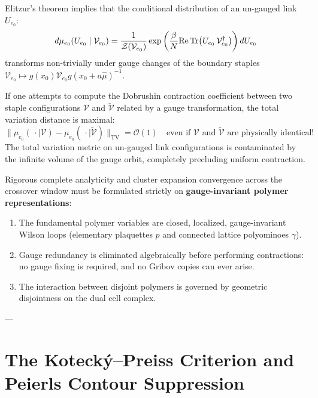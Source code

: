 Elitzur's theorem implies that the conditional distribution of an un-gauged link $U_{e_0}$:
\begin{equation}
\label{eq:ch13_conditional_link_measure}
d\mu_{e_0}(U_{e_0} \mid \mathcal{V}_{e_0}) = \frac{1}{\mathcal{Z}(\mathcal{V}_{e_0})} \exp\left( \frac{\beta}{N} \mathrm{Re} \, \mathrm{Tr}\bigl( U_{e_0} \, \mathcal{V}_{e_0}^\dagger \bigr) \right) dU_{e_0}
\end{equation}
transforms non-trivially under gauge changes of the boundary staples $\mathcal{V}_{e_0} \mapsto g(x_0) \mathcal{V}_{e_0} g(x_0 + a\hat{\mu})^{-1}$. 

If one attempts to compute the Dobrushin contraction coefficient between two staple configurations $\mathcal{V}$ and $\tilde{\mathcal{V}}$ related by a gauge transformation, the total variation distance is maximal:
\begin{equation}
\|\mu_{e_0}(\,\cdot \mid \mathcal{V}) - \mu_{e_0}(\,\cdot \mid \tilde{\mathcal{V}})\|_{\mathrm{TV}} = \mathcal{O}(1) \quad \text{even if } \mathcal{V} \text{ and } \tilde{\mathcal{V}} \text{ are physically identical!}
\end{equation}
The total variation metric on un-gauged link configurations is contaminated by the infinite volume of the gauge orbit, completely precluding uniform contraction.

\begin{conclusion}
\label{concl:primacy_polymers}
Rigorous complete analyticity and cluster expansion convergence across the crossover window must be formulated strictly on \textbf{gauge-invariant polymer representations}:
\begin{enumerate}
    \item The fundamental polymer variables are closed, localized, gauge-invariant Wilson loops (elementary plaquettes $p$ and connected lattice polyominoes $\gamma$).
    \item Gauge redundancy is eliminated algebraically before performing contractions: no gauge fixing is required, and no Gribov copies can ever arise.
    \item The interaction between disjoint polymers is governed by geometric disjointness on the dual cell complex.
\end{enumerate}
\end{conclusion}

---

\section{The Koteck\'y--Preiss Criterion and Peierls Contour Suppression}
\label{sec:kotecky_preiss}

